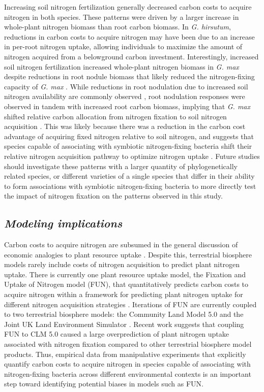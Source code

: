 Increasing soil nitrogen fertilization generally decreased carbon costs to acquire nitrogen in both species. These patterns were driven by a larger increase in whole-plant nitrogen biomass than root carbon biomass. In \textit{G. hirsutum}, reductions in carbon costs to acquire nitrogen may have been due to an increase in per-root nitrogen uptake, allowing individuals to maximize the amount of nitrogen acquired from a belowground carbon investment. Interestingly, increased soil nitrogen fertilization increased whole-plant nitrogen biomass in \textit{G. max} despite reductions in root nodule biomass that likely reduced the nitrogen-fixing capacity of \textit{G. max} . While reductions in root nodulation due to increased soil nitrogen availability are commonly observed , root nodulation responses were observed in tandem with increased root carbon biomass, implying that \textit{G. max} shifted relative carbon allocation from nitrogen fixation to soil nitrogen acquisition . This was likely because there was a reduction in the carbon cost advantage of acquiring fixed nitrogen relative to soil nitrogen, and suggests that species capable of associating with symbiotic nitrogen-fixing bacteria shift their relative nitrogen acquisition pathway to optimize nitrogen uptake . Future studies should investigate these patterns with a larger quantity of phylogenetically related species, or different varieties of a single species that differ in their ability to form associations with symbiotic nitrogen-fixing bacteria to more directly test the impact of nitrogen fixation on the patterns observed in this study.

\subsection{\textit{Modeling implications}}
\noindent Carbon costs to acquire nitrogen are subsumed in the general discussion of economic analogies to plant resource uptake . Despite this, terrestrial biosphere models rarely include costs of nitrogen acquisition to predict plant nitrogen uptake. There is currently one plant resource uptake model, the Fixation and Uptake of Nitrogen model (FUN), that quantitatively predicts carbon costs to acquire nitrogen within a framework for predicting plant nitrogen uptake for different nitrogen acquisition strategies . Iterations of FUN are currently coupled to two terrestrial biosphere models: the Community Land Model 5.0 and the Joint UK Land Environment Simulator . Recent work suggests that coupling FUN to CLM 5.0 caused a large overprediction of plant nitrogen uptake associated with nitrogen fixation  compared to other terrestrial biosphere model products. Thus, empirical data from manipulative experiments that explicitly quantify carbon costs to acquire nitrogen in species capable of associating with nitrogen-fixing bacteria across different environmental contexts is an important step toward identifying potential biases in models such as FUN.

